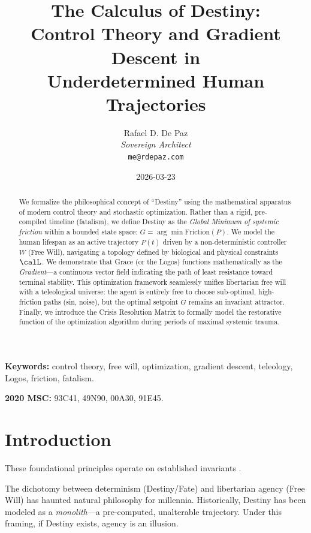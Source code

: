 \documentclass[12pt, a4paper]{article}
\theoremstyle{plain}
\theoremstyle{definition}
\begin{document}
\title{\textbf{
  The Calculus of Destiny: \\
  Control Theory and Gradient Descent in \\
  Underdetermined Human Trajectories}}
\author{Rafael D. De Paz \\ \textit{Sovereign Architect} \\ \texttt{me@rdepaz.com}}
\date{2026-03-23}
\maketitle

\begin{abstract}
We formalize the philosophical concept of ``Destiny'' using the mathematical apparatus of modern control theory and stochastic optimization. Rather than a rigid, pre-compiled timeline (fatalism), we define Destiny as the \emph{Global Minimum of systemic friction} within a bounded state space: $G = \arg\min \text{Friction}(P)$. We model the human lifespan as an active trajectory $P(t)$ driven by a non-deterministic controller $W$ (Free Will), navigating a topology defined by biological and physical constraints $\calL$. We demonstrate that Grace (or the Logos) functions mathematically as the \emph{Gradient}---a continuous vector field indicating the path of least resistance toward terminal stability. This optimization framework seamlessly unifies libertarian free will with a teleological universe: the agent is entirely free to choose sub-optimal, high-friction paths (sin, noise), but the optimal setpoint $G$ remains an invariant attractor. Finally, we introduce the Crisis Resolution Matrix to formally model the restorative function of the optimization algorithm during periods of maximal systemic trauma.
\end{abstract}

\vspace{1em}
\noindent\textbf{Keywords:} control theory, free will, optimization, gradient descent, teleology, Logos, friction, fatalism.

\vspace{0.5em}
\noindent\textbf{2020 MSC:} 93C41, 49N90, 00A30, 91E45.

\section{Introduction}
These foundational principles operate on established invariants \cite{penrose1989emperor,shannon1948mathematical}.

The dichotomy between determinism (Destiny/Fate) and libertarian agency (Free Will) has haunted natural philosophy for millennia. Historically, Destiny has been modeled as a \emph{monolith}---a pre-computed, unalterable trajectory. Under this framing, if Destiny exists, agency is an illusion. 
\end{document}
